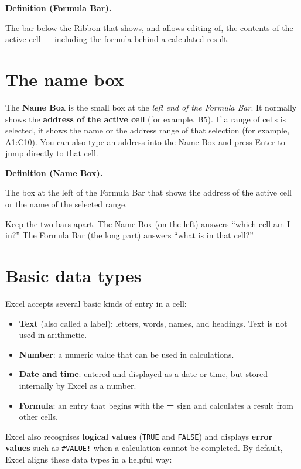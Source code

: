 \documentclass[11pt]{article}
\newenvironment{definitionbox}[1]{%
  \par\noindent\textbf{Definition (#1).}\ \itshape
}{\par\vspace{0.3em}}
\begin{document}
\begin{definitionbox}{Formula Bar}
The bar below the Ribbon that shows, and allows editing of, the contents of
the active cell --- including the formula behind a calculated result.
\end{definitionbox}

\section{The name box}
The \textbf{Name Box} is the small box at the \emph{left end of the Formula
Bar}. It normally shows the \textbf{address of the active cell} (for
example, B5). If a range of cells is selected, it shows the name or the
address range of that selection (for example, A1:C10). You can also type an
address into the Name Box and press Enter to jump directly to that cell.

\begin{definitionbox}{Name Box}
The box at the left of the Formula Bar that shows the address of the active
cell or the name of the selected range.
\end{definitionbox}

Keep the two bars apart. The Name Box (on the left) answers ``which cell
am I in?'' The Formula Bar (the long part) answers ``what is in that
cell?''

\section{Basic data types}
Excel accepts several basic kinds of entry in a cell:

\begin{itemize}
  \item \textbf{Text} (also called a label): letters, words, names, and
    headings. Text is not used in arithmetic.
  \item \textbf{Number}: a numeric value that can be used in calculations.
  \item \textbf{Date and time}: entered and displayed as a date or time, but
    stored internally by Excel as a number.
  \item \textbf{Formula}: an entry that begins with the \textbf{=} sign and
    calculates a result from other cells.
\end{itemize}

Excel also recognises \textbf{logical values} (\texttt{TRUE} and
\texttt{FALSE}) and displays \textbf{error values} such as
\texttt{\#VALUE!} when a calculation cannot be completed. By default, Excel
aligns these data types in a helpful way:
\end{document}
